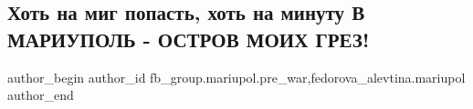  
 
 
 
 

\subsection{Хоть  на  миг  попасть,  хоть  на  минуту В  МАРИУПОЛЬ  -  ОСТРОВ  МОИХ   ГРЕЗ!}
\label{sec:13_02_2023.fb.fb_group.mariupol.pre_war.6.khot__na__mig__popas}
 
\ifcmt
 author_begin
   author_id fb_group.mariupol.pre_war,fedorova_alevtina.mariupol
 author_end
\fi

